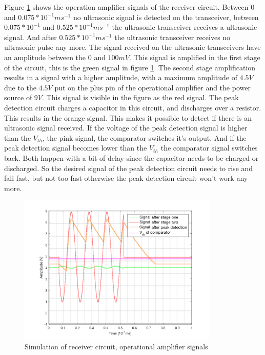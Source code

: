 Figure \ref{fig:sim_receive} shows the operation amplifier signals of the receiver circuit. Between 0 and $0.075*10^{-1}ms^{-1}$ no ultrasonic signal is detected on the transceiver, between $0.075*10^{-1}$ and $0.525*10^{-1}ms^{-1}$ the ultrasonic transceiver receives a ultrasonic signal. And after $0.525*10^{-1}ms^{-1}$ the ultrasonic transceiver receives no ultrasonic pulse any more.
The signal received on the ultrasonic transceivers have an amplitude between the 0 and $100mV$. This signal is amplified in the first stage of the circuit, this is the green signal in figure \ref{fig:sim_receive}. The second stage amplification results in a signal with a higher amplitude, with a maximum amplitude of $4.5V$ due to the $4.5V$ put on the plus pin of the operational amplifier and the power source of $9V$. This signal is visible in the figure as the red signal.
The peak detection circuit charges a capacitor in this circuit, and discharges over a resistor. This results in the orange signal. This makes it possible to detect if there is an ultrasonic signal received. If the voltage of the peak detection signal is higher than the $V_{th}$, the pink signal, the comparator switches it's output. And if the peak detection signal becomes lower than the $V_{th}$ the comparator signal switches back. Both happen with a bit of delay since the capacitor needs to be charged or discharged. So the desired signal of the peak detection circuit needs to rise and fall fast, but not too fast otherwise the peak detection circuit won't work any more.\\

\begin{figure}[H]
\centering
\includegraphics[width=0.85\textwidth]{Figures/receiver_simulations.PNG}
\caption{Simulation of receiver circuit, operational amplifier signals}
\label{fig:sim_receive}
\end{figure}


